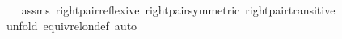 \begin{isabellebody}
%
\isadelimproof
\ \ %
\endisadelimproof
%
\isatagproof
{}\isamarkupfalse%
\ assms\ right{\isacharunderscore}{\kern0pt}pair{\isacharunderscore}{\kern0pt}reflexive\ right{\isacharunderscore}{\kern0pt}pair{\isacharunderscore}{\kern0pt}symmetric\ right{\isacharunderscore}{\kern0pt}pair{\isacharunderscore}{\kern0pt}transitive\isanewline
\ \ \isamarkupfalse%
\ {\isacharparenleft}{\kern0pt}unfold\ equiv{\isacharunderscore}{\kern0pt}rel{\isacharunderscore}{\kern0pt}on{\isacharunderscore}{\kern0pt}def{\isacharcomma}{\kern0pt}\ auto{\isacharparenright}{\kern0pt}%
\endisatagproof
{\isafoldproof}%
%
\isadelimproof
\isanewline
%
\endisadelimproof
%
\isadelimtheory
\isanewline
%
\endisadelimtheory
%
\isatagtheory
{}\isamarkupfalse%
%
\endisatagtheory
{\isafoldtheory}%
%
\isadelimtheory
%
\endisadelimtheory
%
\end{isabellebody}%
\endinput
